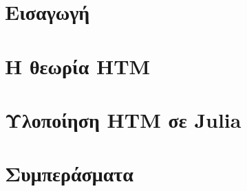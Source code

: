 \documentclass[a4paper,11pt,twoside]{report}
\title{\titlestring}
\author{\authorstring}
\date{13 Ιουνίου 2019}
\begin{document}


\clearpage
\newpage
\thispagestyle{empty}
\mbox{}

\tableofcontents{}
\listoffigures

\chapter{Εισαγωγή}


\chapter{Η θεωρία HTM}


\chapter{Υλοποίηση HTM σε Julia} \label{impl}




\chapter{Συμπεράσματα}


\printbibliography
\end{document}
